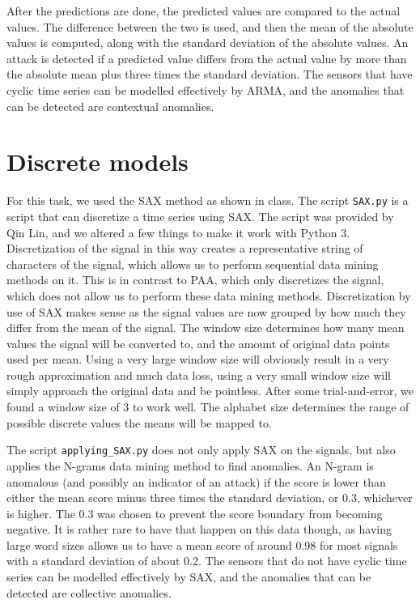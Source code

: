 \documentclass[]{article}
\begin{document}
After the predictions are done, the predicted values are compared to the actual values. The difference between the two is used, and then the mean of the absolute values is computed, along with the standard deviation of the absolute values. An attack is detected if a predicted value differs from the actual value by more than the absolute mean plus three times the standard deviation. The sensors that have cyclic time series can be modelled effectively by ARMA, and the anomalies that can be detected are contextual anomalies.
\section{Discrete models}
For this task, we used the SAX method as shown in class. The script \texttt{SAX.py} is a script that can discretize a time series using SAX. The script was provided by Qin Lin, and we altered a few things to make it work with Python 3. Discretization of the signal in this way creates a representative string of characters of the signal, which allows us to perform sequential data mining methods on it. This is in contrast to PAA, which only discretizes the signal, which does not allow us to perform these data mining methods. Discretization by use of SAX makes sense as the signal values are now grouped by how much they differ from the mean of the signal. The window size determines how many mean values the signal will be converted to, and the amount of original data points used per mean. Using a very large window size will obviously result in a very rough approximation and much data loss, using a very small window size will simply approach the original data and be pointless. After some trial-and-error, we found a window size of 3 to work well. The alphabet size determines the range of possible discrete values the means will be mapped to. 

The script \texttt{applying\_SAX.py} does not only apply SAX on the signals, but also applies the N-grams data mining method to find anomalies. An N-gram is anomalous (and possibly an indicator of an attack) if the score is lower than either the mean score minus three times the standard deviation, or 0.3, whichever is higher. The 0.3 was chosen to prevent the score boundary from becoming negative. It is rather rare to have that happen on this data though, as having large word sizes allows us to have a mean score of around 0.98 for most signals with a standard deviation of about 0.2. The sensors that do not have cyclic time series can be modelled effectively by SAX, and the anomalies that can be detected are collective anomalies.
\clearpage
\end{document}

